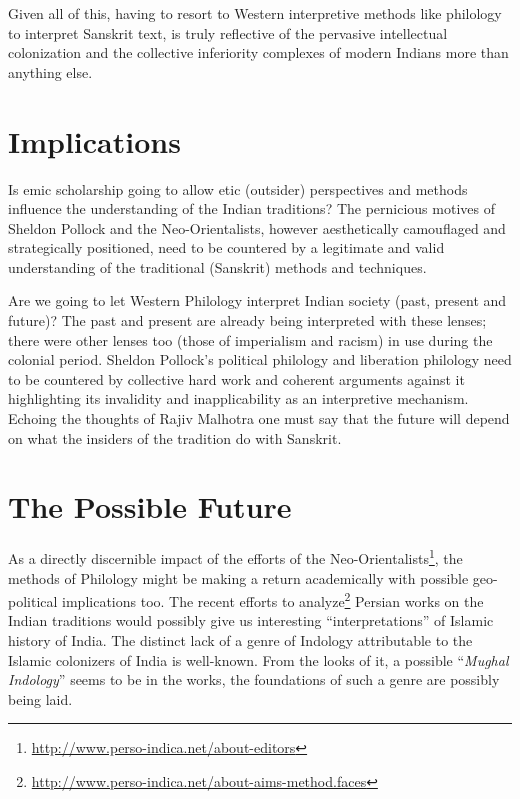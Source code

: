 Given all of this, having to resort to Western interpretive methods like philology to interpret Sanskrit text, is truly reflective of the pervasive intellectual colonization and the collective inferiority complexes of modern Indians more than anything else.


\section*{Implications}

\vskip -7pt

Is emic scholarship going to allow etic (outsider) perspectives and methods influence the understanding of the Indian traditions? The pernicious motives of Sheldon Pollock and the Neo-Orientalists, however aesthetically camouflaged and strategically positioned, need to be countered by a legitimate and valid understanding of the traditional (Sanskrit) methods and techniques.

Are we going to let Western Philology interpret Indian society (past, present and future)? The past and present are already being interpreted with these lenses; there were other lenses too (those of imperialism and racism) in use during the colonial period. Sheldon Pollock’s political philology and liberation philology need to be countered by collective hard work and coherent arguments against it highlighting its invalidity and inapplicability as an interpretive mechanism. Echoing the thoughts of Rajiv Malhotra one must say that the future will depend on what the insiders of the tradition do with Sanskrit.

\vskip -6pt


\section*{The Possible Future}

As a directly discernible impact of the efforts of the Neo-Orientalists\footnote{\url{http://www.perso-indica.net/about-editors}}, the methods of Philology might be making a return academically with possible geo-political implications too. The recent efforts to analyze\footnote{\url{http://www.perso-indica.net/about-aims-method.faces}} Persian works on the Indian traditions would possibly give us interesting “interpretations” of Islamic history of India. The distinct lack of a genre of Indology attributable to the Islamic colonizers of India is well-known. From the looks of it, a possible “\textit{Mughal Indology}” seems to be in the works, the foundations of such a genre are possibly being laid.

